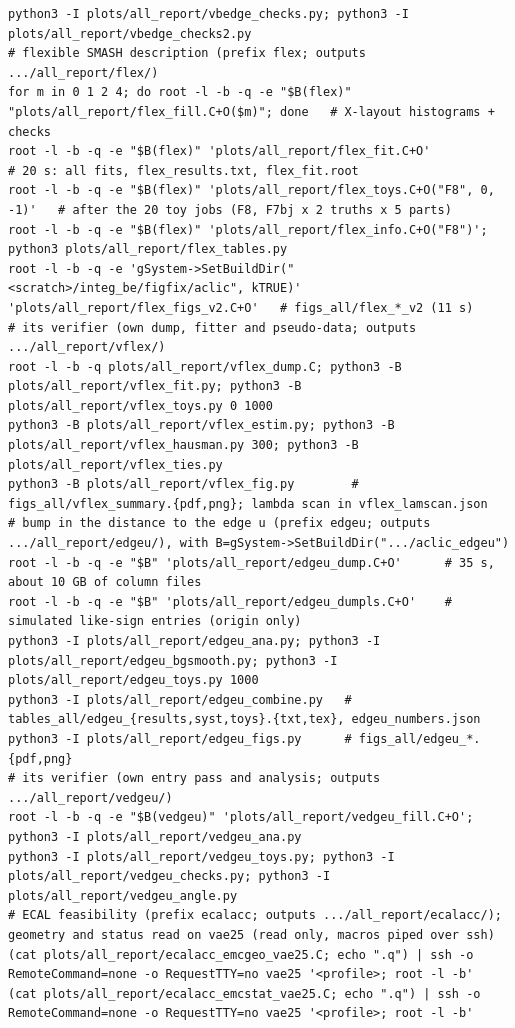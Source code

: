 \documentclass[11pt,a4paper]{article}
\begin{document}
\begin{lstlisting}
python3 -I plots/all_report/vbedge_checks.py; python3 -I plots/all_report/vbedge_checks2.py
# flexible SMASH description (prefix flex; outputs .../all_report/flex/)
for m in 0 1 2 4; do root -l -b -q -e "$B(flex)" "plots/all_report/flex_fill.C+O($m)"; done   # X-layout histograms + checks
root -l -b -q -e "$B(flex)" 'plots/all_report/flex_fit.C+O'             # 20 s: all fits, flex_results.txt, flex_fit.root
root -l -b -q -e "$B(flex)" 'plots/all_report/flex_toys.C+O("F8", 0, -1)'   # after the 20 toy jobs (F8, F7bj x 2 truths x 5 parts)
root -l -b -q -e "$B(flex)" 'plots/all_report/flex_info.C+O("F8")'; python3 plots/all_report/flex_tables.py
root -l -b -q -e 'gSystem->SetBuildDir("<scratch>/integ_be/figfix/aclic", kTRUE)' 'plots/all_report/flex_figs_v2.C+O'   # figs_all/flex_*_v2 (11 s)
# its verifier (own dump, fitter and pseudo-data; outputs .../all_report/vflex/)
root -l -b -q plots/all_report/vflex_dump.C; python3 -B plots/all_report/vflex_fit.py; python3 -B plots/all_report/vflex_toys.py 0 1000
python3 -B plots/all_report/vflex_estim.py; python3 -B plots/all_report/vflex_hausman.py 300; python3 -B plots/all_report/vflex_ties.py
python3 -B plots/all_report/vflex_fig.py        # figs_all/vflex_summary.{pdf,png}; lambda scan in vflex_lamscan.json
# bump in the distance to the edge u (prefix edgeu; outputs .../all_report/edgeu/), with B=gSystem->SetBuildDir(".../aclic_edgeu")
root -l -b -q -e "$B" 'plots/all_report/edgeu_dump.C+O'      # 35 s, about 10 GB of column files
root -l -b -q -e "$B" 'plots/all_report/edgeu_dumpls.C+O'    # simulated like-sign entries (origin only)
python3 -I plots/all_report/edgeu_ana.py; python3 -I plots/all_report/edgeu_bgsmooth.py; python3 -I plots/all_report/edgeu_toys.py 1000
python3 -I plots/all_report/edgeu_combine.py   # tables_all/edgeu_{results,syst,toys}.{txt,tex}, edgeu_numbers.json
python3 -I plots/all_report/edgeu_figs.py      # figs_all/edgeu_*.{pdf,png}
# its verifier (own entry pass and analysis; outputs .../all_report/vedgeu/)
root -l -b -q -e "$B(vedgeu)" 'plots/all_report/vedgeu_fill.C+O'; python3 -I plots/all_report/vedgeu_ana.py
python3 -I plots/all_report/vedgeu_toys.py; python3 -I plots/all_report/vedgeu_checks.py; python3 -I plots/all_report/vedgeu_angle.py
# ECAL feasibility (prefix ecalacc; outputs .../all_report/ecalacc/); geometry and status read on vae25 (read only, macros piped over ssh)
(cat plots/all_report/ecalacc_emcgeo_vae25.C; echo ".q") | ssh -o RemoteCommand=none -o RequestTTY=no vae25 '<profile>; root -l -b'
(cat plots/all_report/ecalacc_emcstat_vae25.C; echo ".q") | ssh -o RemoteCommand=none -o RequestTTY=no vae25 '<profile>; root -l -b'

\end{lstlisting}
\end{document}
